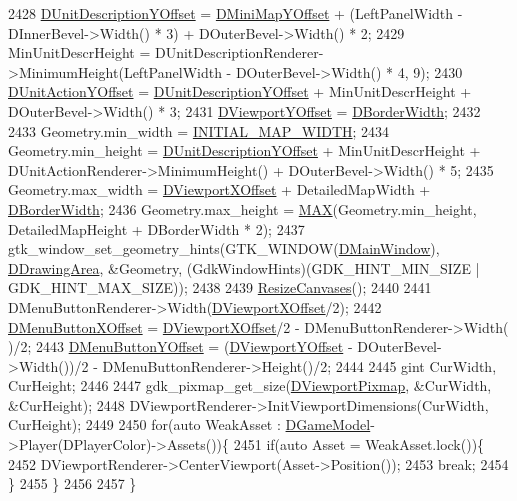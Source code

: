 \begin{DoxyCode}
2428     \hyperlink{classCApplicationData_a6c60b2da482699f1d998acfe24fec332}{DUnitDescriptionYOffset} = \hyperlink{classCApplicationData_ad33fc850bd8262a4bdf1f23e9477d5ad}{DMiniMapYOffset} + (LeftPanelWidth - 
      DInnerBevel->Width() * 3) + DOuterBevel->Width() * 2;
2429     MinUnitDescrHeight = DUnitDescriptionRenderer->MinimumHeight(LeftPanelWidth - DOuterBevel->Width() * 4,
       9);
2430     \hyperlink{classCApplicationData_a8ccfb55bd25cba0e6eb66573ba9c8b3c}{DUnitActionYOffset} = \hyperlink{classCApplicationData_a6c60b2da482699f1d998acfe24fec332}{DUnitDescriptionYOffset} + 
      MinUnitDescrHeight + DOuterBevel->Width() * 3;
2431     \hyperlink{classCApplicationData_afc58ed96a1af813b28f6abf2c7d2dc72}{DViewportYOffset} = \hyperlink{classCApplicationData_a566b69c72fa982c6ecf8e47dc21df489}{DBorderWidth};
2432     
2433     Geometry.min\_width = \hyperlink{main_8cpp_ad7891427e5564fd0ea2a08a5857e4239}{INITIAL\_MAP\_WIDTH};
2434     Geometry.min\_height = \hyperlink{classCApplicationData_a6c60b2da482699f1d998acfe24fec332}{DUnitDescriptionYOffset} + MinUnitDescrHeight + 
      DUnitActionRenderer->MinimumHeight() + DOuterBevel->Width() * 5;
2435     Geometry.max\_width = \hyperlink{classCApplicationData_a306bba873ccc47126111305fe21ef3ff}{DViewportXOffset} + DetailedMapWidth + 
      \hyperlink{classCApplicationData_a566b69c72fa982c6ecf8e47dc21df489}{DBorderWidth};
2436     Geometry.max\_height = \hyperlink{main_8cpp_afa99ec4acc4ecb2dc3c2d05da15d0e3f}{MAX}(Geometry.min\_height, DetailedMapHeight + DBorderWidth * 2);
2437     gtk\_window\_set\_geometry\_hints(GTK\_WINDOW(\hyperlink{classCApplicationData_af3c57a84b4ecca8a7f86b67a0ae55372}{DMainWindow}), 
      \hyperlink{classCApplicationData_a4735f5d31632313e0b2a1659eb178987}{DDrawingArea}, &Geometry, (GdkWindowHints)(GDK\_HINT\_MIN\_SIZE | GDK\_HINT\_MAX\_SIZE));
2438     
2439     \hyperlink{classCApplicationData_ad8b16ccb099b4996ce9fee34a407c091}{ResizeCanvases}();
2440     
2441     DMenuButtonRenderer->Width(\hyperlink{classCApplicationData_a306bba873ccc47126111305fe21ef3ff}{DViewportXOffset}/2);
2442     \hyperlink{classCApplicationData_a04283b17a8c04af8325de4304a848095}{DMenuButtonXOffset} = \hyperlink{classCApplicationData_a306bba873ccc47126111305fe21ef3ff}{DViewportXOffset}/2 - DMenuButtonRenderer->Width(
      )/2;
2443     \hyperlink{classCApplicationData_a63012360d0a98eef89707a503f4379a8}{DMenuButtonYOffset} = (\hyperlink{classCApplicationData_afc58ed96a1af813b28f6abf2c7d2dc72}{DViewportYOffset} - DOuterBevel->Width())/2 - 
      DMenuButtonRenderer->Height()/2;
2444     
2445     gint CurWidth, CurHeight;
2446         
2447     gdk\_pixmap\_get\_size(\hyperlink{classCApplicationData_ac8801e116d0c49776c9f3db7415287fe}{DViewportPixmap}, &CurWidth, &CurHeight); 
2448     DViewportRenderer->InitViewportDimensions(CurWidth, CurHeight); 
2449     
2450     \textcolor{keywordflow}{for}(\textcolor{keyword}{auto} WeakAsset : \hyperlink{classCApplicationData_a32b50c7c1cbac3cfd67c7f775b1d6fee}{DGameModel}->Player(DPlayerColor)->Assets())\{
2451         \textcolor{keywordflow}{if}(\textcolor{keyword}{auto} Asset = WeakAsset.lock())\{
2452             DViewportRenderer->CenterViewport(Asset->Position());
2453             \textcolor{keywordflow}{break};
2454         \}
2455     \}
2456     
2457 \}
\end{DoxyCode}
